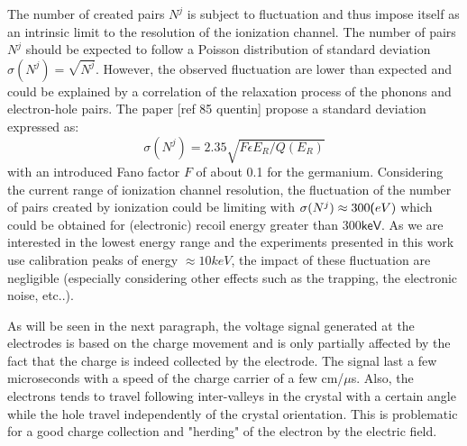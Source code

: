 The number of created pairs $N^j$ is subject to fluctuation and thus impose itself as an intrinsic limit to the resolution of the ionization channel. The number of pairs $N^j$ should be expected to follow a Poisson distribution of standard deviation $\sigma(N^j) = \sqrt{N^j}$. However, the observed fluctuation are lower than expected and could be explained by a correlation of the relaxation process of the phonons and electron-hole pairs. The paper [ref 85 quentin] propose a standard deviation expressed as:
\begin{equation}
\sigma(N^j) = 2.35 \sqrt{F \epsilon E_R / Q(E_R)}
\end{equation}
with an introduced Fano factor $F$ of about 0.1 for the germanium. Considering the current range of ionization channel resolution, the fluctuation of the number of pairs created by ionization could be limiting with $\sigma(N^j) \approx 300\textsf(eV)$ which could be obtained for (electronic) recoil energy greater than $300\textsf{keV}$. As we are interested in the lowest energy range and the experiments presented in this work use calibration peaks of energy $\approx 10keV$, the impact of these fluctuation are negligible (especially considering other effects such as the trapping, the electronic noise, etc..).

As will be seen in the next paragraph, the voltage signal generated at the electrodes is based on the charge movement and is only partially affected by the fact that the charge is indeed collected by the electrode. The signal last a few microseconds with a speed of the charge carrier of a few cm/$\mu$s.
Also, the electrons tends to travel following inter-valleys in the crystal with a certain angle while the hole travel independently of the crystal orientation. This is problematic for a good charge collection and "herding" of the electron by the electric field.


